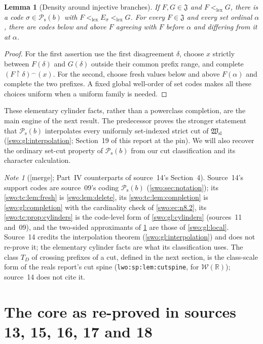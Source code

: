 \documentclass[11pt]{article}
\newtheorem{lemma}[lemma]{Lemma}
\theoremstyle{definition}
\theoremstyle{remark}
\newtheorem{note}[note]{Note}
\newcommand{\WO}{\mathcal W}
\newcommand{\Hsl}{\mathfrak W_{\mathrm{sl}}}
\newcommand{\Jinj}{\mathfrak J}
\newcommand{\Psupp}{\mathcal P_{\mathrm{s}}}
\newcommand{\lex}{\mathrm{lex}}
\newcommand{\cat}{\mathbin{{}^\frown}}
\newcommand{\res}{\mathbin{\upharpoonright}}
\newcommand{\code}[1]{\texttt{\small #1}}
\newcommand{\merge}{\textsf{[merge]}}
\begin{document}
\begin{lemma}[Density around injective branches]\label{swo:tc:lem:branchdensity}
If $F,G\in \Jinj$ and $F<_{\lex} G$, there is a code $\sigma\in \Psupp(b)$
with $F<_{\lex} E_\sigma <_{\lex} G$. For every $F\in \Jinj$ and every set
ordinal $\alpha$, there are codes below and above $F$ agreeing with
$F$ before $\alpha$ and differing from it at $\alpha$.
\end{lemma}
\begin{proof}
For the first assertion use the first disagreement $\delta$, choose
$x$ strictly between $F(\delta)$ and $G(\delta)$ outside their common
prefix range, and complete $(F\res\delta)\cat(x)$. For the second,
choose fresh values below and above $F(\alpha)$ and complete the two
prefixes. A fixed global well-order of set codes makes all these
choices uniform when a uniform family is needed.
\end{proof}

These elementary cylinder facts, rather than a powerclass completion,
are the main engine of the next result. The predecessor proves the
stronger statement that $\Psupp(b)$ interpolates every uniformly
set-indexed strict cut of $\Hsl$ (\cref{swo:gl:interpolation}; Section~19
of this report at the pin).
We will also recover the ordinary set-cut property of $\Psupp(b)$ from
our cut classification and its character calculation.

\begin{note}[\merge; Part~IV counterparts of source~14's Section~4]\label{swo:viii:note:core}
Source~14's support codes are source~09's coding $\Psupp(b)$
(\cref{swo:sec:notation}); its \cref{swo:tc:lem:fresh} is \cref{swo:lem:delete},
its \cref{swo:tc:lem:completion} is \cref{swo:gl:completion} with the
cardinality check of \cref{swo:ec:n8.2}, its \cref{swo:tc:prop:cylinders} is
the code-level form of \cref{swo:gl:cylinders} (sources~11 and~09), and the
two-sided approximants of \cref{swo:tc:lem:branchdensity} are those of
\cref{swo:gl:local}. Source~14 credits the interpolation theorem
(\cref{swo:gl:interpolation}) and does not re-prove it; the elementary
cylinder facts are what its classification uses. The class $T_D$ of crossing
prefixes of a cut, defined in the next section, is the class-scale form of
the reals report's cut spine (\code{lwo:sp:lem:cutspine}, for $\WO(\mathbb
R)$); source~14 does not cite it.
\end{note}

\section{The core as re-proved in sources 13, 15, 16, 17 and 18}\label{swo:viii:sec:reproved}
\end{document}

